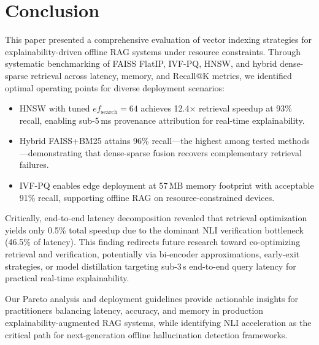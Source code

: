 \documentclass[conference]{IEEEtran}
\begin{document}
\section{Conclusion}

This paper presented a comprehensive evaluation of vector indexing strategies for explainability-driven offline RAG systems under resource constraints. Through systematic benchmarking of FAISS FlatIP, IVF-PQ, HNSW, and hybrid dense-sparse retrieval across latency, memory, and Recall@K metrics, we identified optimal operating points for diverse deployment scenarios:

\begin{itemize}
    \item HNSW with tuned $ef_{\mathrm{search}}{=}64$ achieves 12.4$\times$ retrieval speedup at 93\% recall, enabling sub-5\,ms provenance attribution for real-time explainability.
    \item Hybrid FAISS+BM25 attains 96\% recall—the highest among tested methods—demonstrating that dense-sparse fusion recovers complementary retrieval failures.
    \item IVF-PQ enables edge deployment at 57\,MB memory footprint with acceptable 91\% recall, supporting offline RAG on resource-constrained devices.
\end{itemize}

Critically, end-to-end latency decomposition revealed that retrieval optimization yields only 0.5\% total speedup due to the dominant NLI verification bottleneck (46.5\% of latency). This finding redirects future research toward co-optimizing retrieval and verification, potentially via bi-encoder approximations, early-exit strategies, or model distillation targeting sub-3\,s end-to-end query latency for practical real-time explainability.

Our Pareto analysis and deployment guidelines provide actionable insights for practitioners balancing latency, accuracy, and memory in production explainability-augmented RAG systems, while identifying NLI acceleration as the critical path for next-generation offline hallucination detection frameworks.



\end{document}
